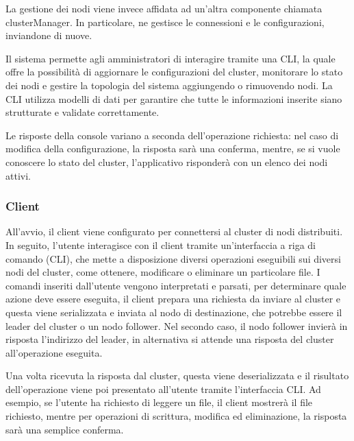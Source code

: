 La gestione dei nodi viene invece affidata ad un'altra componente chiamata clusterManager. In particolare, ne gestisce le connessioni e le configurazioni, inviandone di nuove. 

Il sistema permette agli amministratori di interagire tramite una CLI, la quale offre la possibilità di aggiornare le configurazioni del cluster, monitorare lo stato dei nodi e gestire la topologia del sistema aggiungendo o 
rimuovendo nodi. La CLI utilizza modelli di dati per garantire che tutte le informazioni inserite siano strutturate e validate correttamente.

Le risposte della console variano a seconda dell'operazione richiesta: nel caso di modifica della configurazione, la risposta sarà una conferma, mentre, se si vuole conoscere lo stato del cluster, l'applicativo risponderà con un 
elenco dei nodi attivi.

\subsubsection{Client}
All'avvio, il client viene configurato per connettersi al cluster di nodi distribuiti. In seguito, l'utente interagisce con il client tramite un'interfaccia a riga di comando (CLI), che mette a disposizione diversi operazioni 
eseguibili sui diversi nodi del cluster, come ottenere, modificare o eliminare un particolare file. 
I comandi inseriti dall'utente vengono interpretati e parsati, per determinare quale azione deve essere eseguita, il client prepara una richiesta da inviare al cluster e questa viene serializzata e inviata al nodo di destinazione, 
che potrebbe essere il leader del cluster o un nodo follower. Nel secondo caso, il nodo follower invierà in risposta l'indirizzo del leader, in alternativa si attende una risposta del cluster all'operazione eseguita.

Una volta ricevuta la risposta dal cluster, questa viene deserializzata e il risultato dell'operazione viene poi presentato all'utente tramite l'interfaccia CLI. Ad esempio, se l'utente ha richiesto di leggere un file, 
il client mostrerà il file richiesto, mentre per operazioni di scrittura, modifica ed eliminazione, la risposta sarà una semplice conferma.

